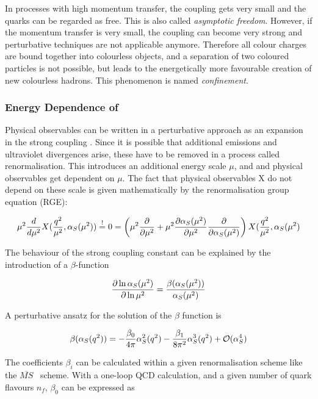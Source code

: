 In processes with high momentum transfer, the coupling gets very small and the quarks can be regarded as free. This is also called \emph{asymptotic freedom}. However, if the momentum transfer is very small, the coupling can become very strong and perturbative techniques are not applicable anymore. Therefore all colour charges are bound together into colourless objects, and a separation of two coloured particles is not possible, but leads to the energetically more favourable creation of new colourless hadrons. This phenomenon is named \emph{confinement}.

\subsubsection{Energy Dependence of \as}

Physical observables can be written in a perturbative approach as an expansion in the strong coupling \as. Since it is possible that additional emissions and ultraviolet divergences arise, these have to be removed in a process called renormalisation. This introduces an additional energy scale $\mu$, and \as and physical observables get dependent on $\mu$. The fact that physical observables X do not depend on these scale is given mathematically by the renormalisation group equation (RGE):

\begin{equation}
\mu^2 \frac{d}{d \mu^2} X(\frac{q^2}{\mu^2},\alpha_S(\mu^2)) \stackrel{!}{=} 0 = \left( \mu^2 \frac{\partial}{\partial \mu^2} + \mu^2 \frac{\partial \alpha_S(\mu^2)}{\partial \mu^2} \frac{\partial}{\partial \alpha_S(\mu^2)} \right) X (\frac{q^2}{\mu^2},\alpha_S(\mu^2)
\end{equation}

The behaviour of the strong coupling constant can be explained by the introduction of a $\beta$-function


\begin{equation}
\frac{\partial \ln \alpha_S(\mu^2)}{\partial \ln \mu^2} = \frac{\beta(\alpha_S(\mu^2))}{\alpha_S(\mu^2)}
\end{equation}

A perturbative ansatz for the solution of the $\beta$ function is 

\begin{equation}
\beta(\alpha_S(q^2)) = - \frac{\beta_0}{4\pi} \alpha_S^2(q^2) -\frac{\beta_1}{8 \pi^2} \alpha_S^3(q^2) + \mathcal{O}(\alpha_S^4)
\end{equation}

The coefficients $\beta_i$ can be calculated within a given renormalisation scheme like the $\overline{MS}$~\cite{PhysRevD.18.3998} scheme. With a one-loop QCD calculation, and a given number of quark flavours $n_f$, $\beta_0$ can be expressed as

